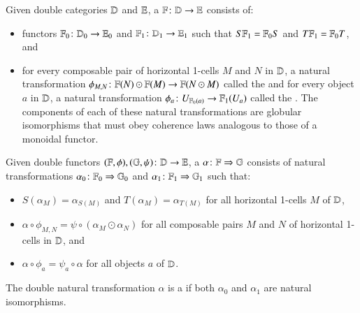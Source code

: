 \documentclass[reqno]{amsart}
\begin{document}
\begin{defn}\label{def:doublefun}
Given double categories $\mathbf{\mathbb D}$ and $\mathbf{\mathbb E}$, a  $\mathbf{\mathbb F} \colon \mathbf{\mathbb D} \to \mathbf{\mathbb E}$ consists of:
\begin{itemize}
\item{functors $\mathbf{\mathbb F}_0 \colon \mathbf{\mathbb D}_0 \to \mathbf{\mathbb E}_0$ and $\mathbf{\mathbb F}_1 \colon \mathbf{\mathbb D}_1 \to \mathbf{\mathbb E}_1$ such that $S \mathbf{\mathbb F}_1 = \mathbf{\mathbb F}_0 S$ and $T \mathbf{\mathbb F}_1 = \mathbf{\mathbb F}_0 T$, and}
\item{for every composable pair of horizontal 1-cells $M$ and $N$ in $\mathbf{\mathbb D}$, a natural transformation $\phi_{M,N} \colon \mathbf{\mathbb F}(N) \odot \mathbf{\mathbb F}(M) \to \mathbf{\mathbb F}(N \odot M)$ called the  and for every object $a$ in $\mathbf{\mathbb D}$, a natural transformation $\phi_a \colon U_{\mathbf{\mathbb F}_0(a)} \to \mathbf{\mathbb F}_1(U_a)$ called the . The components of each of these natural transformations are globular isomorphisms that must obey coherence laws analogous to those of a monoidal functor.}
\end{itemize}
\end{defn}

\begin{defn}
Given double functors $(\mathbf{\mathbb F},\phi),(\mathbb{G},\psi) \colon \mathbf{\mathbb D} \to \mathbf{\mathbb E}$, a  $\alpha \colon \mathbf{\mathbb F} \Rightarrow \mathbb{G}$ consists of natural transformations $\alpha_0 \colon \mathbf{\mathbb F}_0 \Rightarrow \mathbb{G}_0$ and $\alpha_1 \colon \mathbf{\mathbb F}_1 \Rightarrow \mathbb{G}_1$ such that:
\begin{itemize}
\item{$S(\alpha_M) = \alpha_{S(M)}$ and $T(\alpha_M) = \alpha_{T(M)}$ for all horizontal 1-cells $M$ of $\mathbf{\mathbb D}$,}
\item{$\alpha \circ \phi_{M,N} = \psi \circ (\alpha_M \odot \alpha_N)$ for all composable pairs $M$ and $N$ of horizontal 1-cells in $\mathbf{\mathbb D}$, and}
\item{$\alpha \circ \phi_a = \psi_a \circ \alpha$ for all objects $a$ of $\mathbf{\mathbb D}$.}
\end{itemize} 
The double natural transformation $\alpha$ is a  if both $\alpha_0$ and $\alpha_1$ are natural isomorphisms.
\end{defn}
\end{document}
